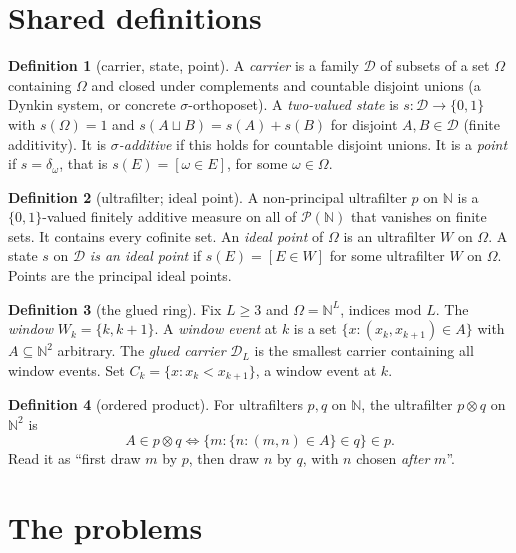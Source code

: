 \documentclass[11pt]{article}
\theoremstyle{definition}
\newtheorem{definition}{Definition}
\theoremstyle{remark}
\newcommand{\bbN}{\mathbb{N}}
\newcommand{\cD}{\mathcal{D}}
\begin{document}
\section*{Shared definitions}

\begin{definition}[carrier, state, point]
A \emph{carrier} is a family $\cD$ of subsets of a set $\Omega$ containing
$\Omega$ and closed under complements and countable disjoint unions (a Dynkin
system, or concrete $\sigma$-orthoposet). A \emph{two-valued state} is
$s:\cD\to\{0,1\}$ with $s(\Omega)=1$ and $s(A\sqcup B)=s(A)+s(B)$ for disjoint
$A,B\in\cD$ (finite additivity). It is \emph{$\sigma$-additive} if this holds
for countable disjoint unions. It is a \emph{point} if $s=\delta_\omega$, that is
$s(E)=[\omega\in E]$, for some $\omega\in\Omega$.
\end{definition}

\begin{definition}[ultrafilter; ideal point]
A non-principal ultrafilter $p$ on $\bbN$ is a $\{0,1\}$-valued finitely additive
measure on all of $\mathcal P(\bbN)$ that vanishes on finite sets. It contains
every cofinite set. An \emph{ideal point} of $\Omega$ is an ultrafilter $W$ on
$\Omega$. A state $s$ on $\cD$ \emph{is an ideal point} if $s(E)=[E\in W]$ for
some ultrafilter $W$ on $\Omega$. Points are the principal ideal points.
\end{definition}

\begin{definition}[the glued ring]
Fix $L\ge3$ and $\Omega=\bbN^{L}$, indices mod $L$. The \emph{window}
$W_k=\{k,k{+}1\}$. A \emph{window event} at $k$ is a set
$\{x:(x_k,x_{k+1})\in A\}$ with $A\subseteq\bbN^2$ arbitrary. The \emph{glued
carrier} $\cD_L$ is the smallest carrier containing all window events. Set
$C_k=\{x: x_k<x_{k+1}\}$, a window event at $k$.
\end{definition}

\begin{definition}[ordered product]
For ultrafilters $p,q$ on $\bbN$, the ultrafilter $p\otimes q$ on $\bbN^2$ is
\[ A\in p\otimes q \iff \{m : \{n : (m,n)\in A\}\in q\}\in p . \]
Read it as ``first draw $m$ by $p$, then draw $n$ by $q$, with $n$ chosen
\emph{after} $m$''.
\end{definition}

\section{The problems}
\end{document}
